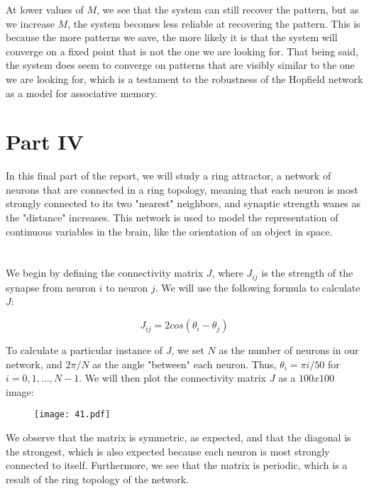 \documentclass{article}
\begin{document}
\FloatBarrier
At lower values of $M$, we see that the system can still recover the pattern, but as we increase $M$, the system becomes less reliable at recovering the pattern. This is because the more patterns we save, the more likely it is that the system will converge on a fixed point that is not the one we are looking for. That being said, the system does seem to converge on patterns that are visibly similar to the one we are looking for, which is a testament to the robustness of the Hopfield network as a model for associative memory.
\vspace{1em}


\setcounter{section}{0}
\renewcommand{\thesection}{4.\arabic{section}}
\section*{Part IV}
In this final part of the report, we will study a ring attractor, a network of neurons that are connected in a ring topology, meaning that each neuron is most strongly connected to its two "nearest" neighbors, and synaptic strength wanes as the "distance" increases. This network is used to model the representation of continuous variables in the brain, like the orientation of an object in space.
\vspace{1em}



\section{}
We begin by defining the connectivity matrix $J$, where $J_{ij}$ is the strength of the synapse from neuron $i$ to neuron $j$. We will use the following formula to calculate $J$:

\begin{equation}
    J_{ij} = 2cos(\theta_i - \theta_j)
\end{equation}


To calculate a particular instance of $J$, we set $N$ as the number of neurons in our network, and $2 \pi / N$ as the angle "between" each neuron. Thus, $\theta_i = \pi i / 50$ for $i = 0, 1, ..., N-1$. We will then plot the connectivity matrix $J$ as a $100x100$ image:

\begin{figure}[ht]
    \centering
    \texttt{[image: 41.pdf]}
\end{figure}

We observe that the matrix is symmetric, as expected, and that the diagonal is the strongest, which is also expected because each neuron is most strongly connected to itself. Furthermore, we see that the matrix is periodic, which is a result of the ring topology of the network.
\vspace{1em}
\end{document}
